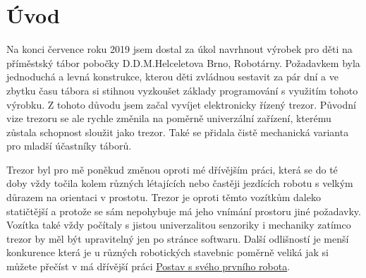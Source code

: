 \chapter*{Úvod}

Na konci července roku 2019 jsem dostal za úkol navrhnout výrobek pro děti na příměstský tábor pobočky D.D.M.Helceletova Brno, Robotárny. %
 Poža\-dav\-kem 
byla jednoduchá a levná konstrukce, kterou děti zvládnou sestavit za pár dní a ve zbytku času tábora si stihnou vyzkoušet základy programování 
s využitím tohoto výrobku. Z tohoto důvodu jsem začal vyvíjet elektronicky řízený trezor. Původní vize trezoru se ale rychle změnila na poměrně 
univerzální zařízení, kterému zůstala schopnost sloužit jako trezor. Také se přidala čistě mechanická varianta pro mladší účastníky táborů.

Trezor byl pro mě poněkud změnou oproti mé dřívějším práci, která se do té doby vždy točila kolem různých létajících nebo častěji jezdících robotu s velkým důrazem na orientaci v prostotu.
Trezor je oproti těmto vozítkům daleko statičtější a protože se sám nepohybuje má jeho vnímání prostoru jiné požadavky. Vozítka také vždy počítaly s jistou univerzalitou senzoriky i mechaniky
zatímco trezor by měl být upravitelný jen po stránce softwaru. Další odlišností je menší konkurence která je u různých robotických stavebnic poměrně veliká jak si můžete přečíst 
v má dřívější práci \href{https://github.com/TVavrinec/SOC-text/blob/master/SOČ.pdf}{Postav s svého prvního robota}.




\newpage